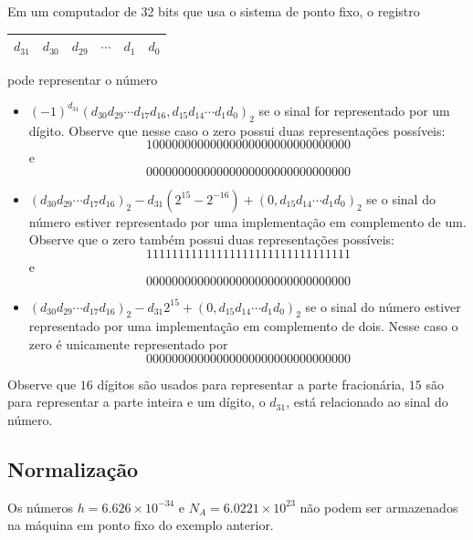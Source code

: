 \begin{ex}
Em um computador de 32 bits que usa o sistema de ponto fixo, o registro
\begin{center}
  \begin{tabular}{|c|c|c|c|c|c|} \hline
    $d_{31}$ & $d_{30}$ & $d_{29}$ & $\cdots$ & $d_1$ & $d_0$\\\hline
  \end{tabular}  
\end{center}
pode representar o número
\begin{itemize}
\item $(-1)^{d_{31}}(d_{30}d_{29}\cdots d_{17}d_{16}, d_{15}d_{14}\cdots d_1d_0)_2$
se o sinal for representado por um dígito. Observe que nesse caso o zero possui duas representações possíveis: 
\begin{equation*}
  10000000000000000000000000000000  
\end{equation*}
e
\begin{equation*}
  00000000000000000000000000000000
\end{equation*}
\item $(d_{30}d_{29}\cdots d_{17}d_{16})_2-d_{31}(2^{15}-2^{-16})+(0,d_{15}d_{14}\cdots d_1d_0)_2$
se o sinal do número estiver representado por uma implementação em complemento de um. Observe que o zero também possui duas representações possíveis: 
\begin{equation*}
  11111111111111111111111111111111  
\end{equation*}
e
\begin{equation*}
  00000000000000000000000000000000
\end{equation*}
\item $(d_{30}d_{29}\cdots d_{17}d_{16})_2-d_{31}2^{15}+(0,d_{15}d_{14}\cdots d_1d_0)_2$
se o sinal do número estiver representado por uma implementação em complemento de dois. Nesse caso o zero é unicamente representado por
\begin{equation*}
  00000000000000000000000000000000  
\end{equation*}
\end{itemize}
Observe que $16$ dígitos são usados para representar a parte fracionária, $15$ são para representar a parte inteira e um dígito, o $d_{31}$, está relacionado ao sinal do número.
\end{ex}

\subsection{Normalização}
Os números $h=6.626\times 10^{-34}$ e $N_A=6.0221\times 10^{23}$ não podem ser armazenados na máquina em ponto fixo do exemplo anterior.

